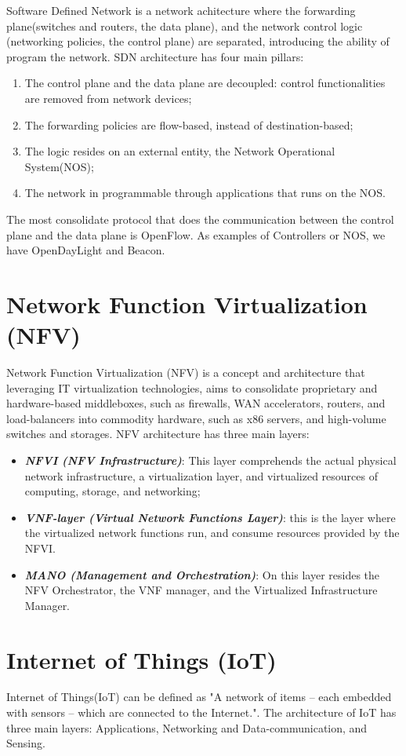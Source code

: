 Software Defined Network\cite{sdn-survey} is a network achitecture where the forwarding plane(switches and routers, the data plane), and the network control logic (networking policies, the control plane) are separated, introducing the ability of program the network.  SDN architecture has four main pillars:
\begin{enumerate}[label=\roman*]
    \item The control plane and the data plane are decoupled: control functionalities are removed from network devices;
    \item The forwarding policies are flow-based, instead of destination-based; 
    \item The logic resides on an external entity, the Network Operational System(\acrshort{NOS});
    \item The network in programmable through applications that runs on the NOS.
\end{enumerate}
The most consolidate protocol that does the communication between the control plane and the data plane is OpenFlow. As examples of Controllers or NOS, we have OpenDayLight and Beacon. 


\section{Network Function Virtualization (NFV)}

Network Function Virtualization (NFV)\cite{nfv-survey} is a concept and architecture that leveraging \acrshort{IT} virtualization technologies, aims to consolidate proprietary and hardware-based middleboxes, such as firewalls, WAN accelerators, routers, and load-balancers into commodity hardware, such as x86 servers, and high-volume switches and storages. NFV architecture has three main layers:
\begin{itemize}
    \item \textit{\textbf{\acrshort{NFVI} (NFV Infrastructure)}}: This layer comprehends the actual physical network infrastructure, a virtualization layer, and virtualized resources of computing, storage, and networking;
    \item \textit{\textbf{VNF-layer (Virtual Network Functions Layer)}}: this is the layer where the virtualized network functions run, and consume resources provided by the NFVI.
    \item \textit{\textbf{\acrshort{MANO} (Management and Orchestration)}}: On this layer resides the NFV Orchestrator, the VNF manager, and the Virtualized Infrastructure Manager. 
\end{itemize}


\section{Internet of Things (IoT)}


Internet of Things(IoT)\cite{iot-ieee} can be defined as "A network of items -- each embedded with sensors -- which are connected to the Internet."\cite{iot-ieee}. The architecture of IoT has three main layers: Applications, Networking and Data-communication, and Sensing. 





